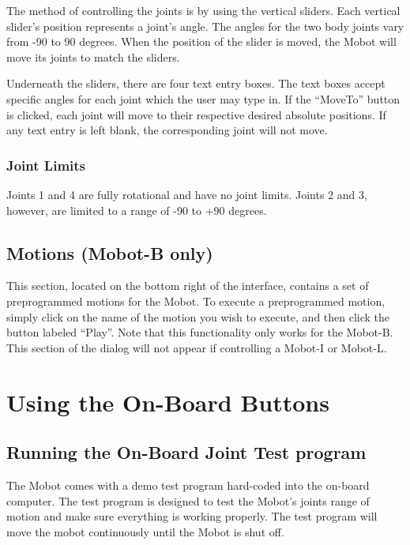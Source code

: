 \documentclass{article}
\begin{document}
The method of controlling the joints is by using the vertical sliders.
Each vertical slider's position represents a joint's angle. 
 The angles for the two body joints vary from -90 to 90 degrees. When
the position of the slider is moved, the Mobot will move its joints to match the 
sliders. 

Underneath the sliders, there are four text entry boxes. The text boxes
accept specific angles for each joint which the user may type in. If 
the ``MoveTo'' button is clicked, each joint will move to their respective 
desired absolute positions. If any text entry is left blank, the corresponding joint will
not move. 

\subsubsection{Joint Limits}
Joints 1 and 4 are fully rotational and have no joint limits. Joints 2 and 3, however, are 
limited to a range of -90 to +90 degrees.

\subsection{Motions (Mobot-B only)}
This section, located on the bottom right of the interface, contains a set of
preprogrammed motions for the Mobot. To execute a preprogrammed motion, simply
click on the name of the motion you wish to execute, and then click the button
labeled ``Play''. Note that this functionality only works for the Mobot-B. 
This section of the dialog will not appear if controlling a Mobot-I or Mobot-L.

\section{Using the On-Board Buttons}
\subsection{Running the On-Board Joint Test program}
The Mobot comes with a demo test program hard-coded into the on-board
computer. The test program is designed to test the Mobot's joints range of 
motion and make sure everything is working properly. The test program will
move the mobot continuously until the Mobot is shut off.
\end{document}
